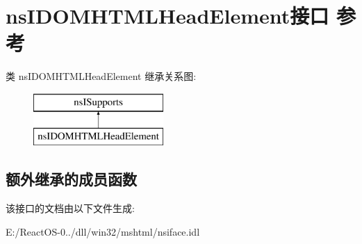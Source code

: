 \hypertarget{interfacens_i_d_o_m_h_t_m_l_head_element}{}\section{ns\+I\+D\+O\+M\+H\+T\+M\+L\+Head\+Element接口 参考}
\label{interfacens_i_d_o_m_h_t_m_l_head_element}
类 ns\+I\+D\+O\+M\+H\+T\+M\+L\+Head\+Element 继承关系图\+:\begin{figure}[H]
\begin{center}
\leavevmode
\includegraphics[height=2.000000cm]{interfacens_i_d_o_m_h_t_m_l_head_element}
\end{center}
\end{figure}
\subsection*{额外继承的成员函数}


该接口的文档由以下文件生成\+:\begin{DoxyCompactItemize}
\item 
E\+:/\+React\+O\+S-\/0../dll/win32/mshtml/nsiface.\+idl\end{DoxyCompactItemize}
